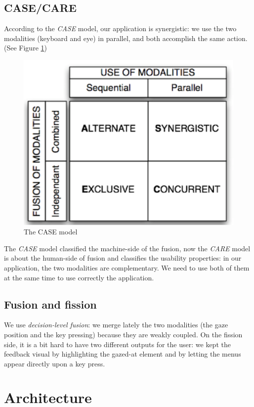 \documentclass[12pt, a4paper, twoside]{article}
\begin{document}
\subsection{CASE/CARE}
According to the \textit{CASE} model, our application is synergistic: we use the two modalities (keyboard and eye) in parallel, and both accomplish the same action. (See Figure \ref{case-model})
\begin{figure}\centering
\includegraphics[scale=0.9]{casecare}
\caption{The CASE model}
\label{case-model}
\end{figure}
\newline
The \textit{CASE} model classified the machine-side of the fusion, now the \textit{CARE} model is about the human-side of fusion and classifies the usability properties: in our application, the two modalities are complementary. We need to use both of them at the same time to use correctly the application. 

\subsection{Fusion and fission}
We use \textit{decision-level fusion}: we merge lately the two modalities (the gaze position and the key pressing) because they are weakly coupled. On the fission side, it is a bit hard to have two different outputs for the user: we kept the feedback visual by highlighting the gazed-at element and by letting the menus appear directly upon a key press.  

\section{Architecture}
\end{document}
